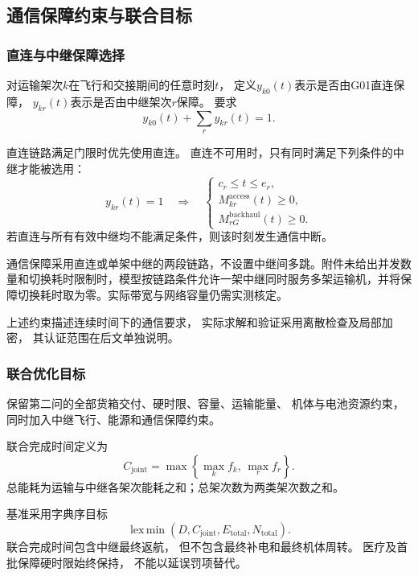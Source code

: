 \documentclass[bwprint]{gmcmthesis}
\begin{document}
\subsection{通信保障约束与联合目标}

\subsubsection{直连与中继保障选择}

对运输架次$k$在飞行和交接期间的任意时刻$t$，
定义$y_{k0}(t)$表示是否由G01直连保障，
$y_{kr}(t)$表示是否由中继架次$r$保障。
要求
\begin{equation}
    y_{k0}(t)+\sum_r y_{kr}(t)=1.
\end{equation}

直连链路满足门限时优先使用直连。
直连不可用时，只有同时满足下列条件的中继才能被选用：
\begin{equation}
    y_{kr}(t)=1
    \quad\Longrightarrow\quad
    \begin{cases}
        c_r\leq t\leq e_r,\\
        M_{kr}^{\mathrm{access}}(t)\geq0,\\
        M_{rG}^{\mathrm{backhaul}}(t)\geq0.
    \end{cases}
    \label{eq:q3_relay_coverage}
\end{equation}
若直连与所有有效中继均不能满足条件，则该时刻发生通信中断。

通信保障采用直连或单架中继的两段链路，不设置中继间多跳。附件未给出并发数量和切换耗时限制时，模型按链路条件允许一架中继同时服务多架运输机，并将保障切换耗时取为零。实际带宽与网络容量仍需实测核定。

上述约束描述连续时间下的通信要求，
实际求解和验证采用离散检查及局部加密，
其认证范围在后文单独说明。

\subsubsection{联合优化目标}

保留第二问的全部货箱交付、硬时限、容量、运输能量、
机体与电池资源约束，
同时加入中继飞行、能源和通信保障约束。

联合完成时间定义为
\begin{equation}
    C_{\mathrm{joint}}
    =
    \max\left\{
    \max_k f_k,\,
    \max_r f_r
    \right\}.
\end{equation}
总能耗为运输与中继各架次能耗之和；总架次数为两类架次数之和。

基准采用字典序目标
\begin{equation}
    \operatorname{lex\,min}
    \left(
    D,C_{\mathrm{joint}},
    E_{\mathrm{total}},N_{\mathrm{total}}
    \right).
\end{equation}
联合完成时间包含中继最终返航，
但不包含最终补电和最终机体周转。
医疗及首批保障硬时限始终保持，
不能以延误罚项替代。
\end{document}
